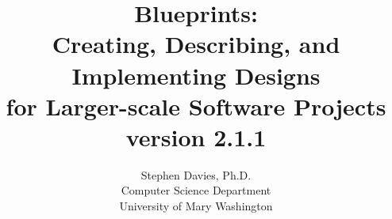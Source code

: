 \documentclass[11pt]{memoir}
\begin{document}
\title{{\Huge Blueprints:}\\
{\Large Creating, Describing, and Implementing Designs}\\
{\Large for Larger-scale Software Projects}\\{\small version 2.1.1}}
\author{Stephen Davies, Ph.D.\\Computer Science Department\\University of Mary Washington}
\date{}
\maketitle


\frontmatter

\renewcommand{\contentsname}{Contents}

\begingroup
  \null
  \newpage
\endgroup

\setcounter{tocdepth}{0}
\tableofcontents

%

\setcounter{chapter}{0}

\mainmatter



















\begingroup
  \null
  \newpage
\endgroup
\backmatter
\printindex


\shipout\null
\end{document}
